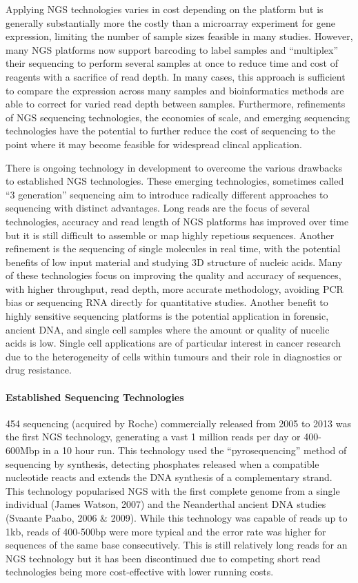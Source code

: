 Applying NGS technologies varies in cost depending on the platform but is generally substantially more the costly than a microarray experiment for gene expression, limiting the number of sample sizes feasible in many studies.  However, many NGS platforms now support barcoding to label samples and ``multiplex'' their sequencing to perform several samples at once to reduce time and cost of reagents with a sacrifice of read depth. In many cases, this approach is sufficient to compare the expression across many samples and bioinformatics methods are able to correct for varied read depth between samples. Furthermore, refinements of NGS sequencing technologies, the economies of scale, and emerging sequencing technologies have the potential to further reduce the cost of sequencing to the point where it may become feasible for widespread clincal application.  

There is ongoing technology in development to overcome the various drawbacks to established NGS technologies. These emerging technologies, sometimes called ``3 generation'' sequencing aim to introduce radically different approaches to sequencing with distinct advantages. Long reads are the focus of several technologies, accuracy and read length of NGS platforms has improved over time but it is still difficult to assemble or map highly repetious sequences. Another refinement is the sequencing of single molecules in real time, with the potential benefits of low input material and studying 3D structure of nucleic acids. Many of these technologies focus on improving the quality and accuracy of sequences, with higher throughput, read depth, more accurate methodology, avoiding PCR bias or sequencing RNA directly for quantitative studies. Another benefit to highly sensitive sequencing platforms is the potential application in forensic, ancient DNA, and single cell samples where the amount or quality of nucelic acids is low. Single cell applications are of particular interest in cancer research due to the heterogeneity of cells within tumours and their role in diagnostics or drug resistance.

\paragraph{Established Sequencing Technologies}

454 sequencing (acquired by Roche) commercially released from 2005 to 2013 was the first NGS technology, generating a vast 1 million reads per day or 400-600Mbp in a 10 hour run. This technology used the ``pyrosequencing'' method of sequencing by synthesis, detecting phosphates released when a compatible nucleotide reacts and extends the DNA synthesis of a complementary strand. This technology popularised NGS with the first complete genome from a single individual (James Watson, 2007) and the Neanderthal ancient DNA studies (Svaante Paabo, 2006 \& 2009). While this technology was capable of reads up to 1kb, reads of 400-500bp were more typical and the error rate was higher for sequences of the same base consecutively. This is still relatively long reads for an NGS technology but it has been discontinued due to competing short read technologies being more cost-effective with lower running costs.

